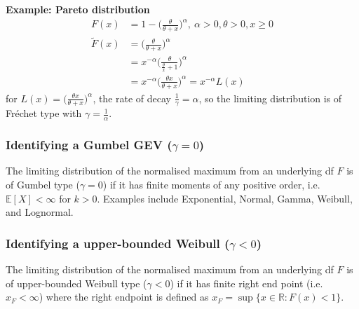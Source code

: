 \documentclass[11pt]{article}
\newcommand{\noi}{\noindent}
\begin{document}
\noi \textbf{Example: Pareto distribution}
\begin{align*}
    F(x) &= 1 - \Big( \frac{\theta}{\theta + x} \Big)^\alpha, \: \alpha >0, \theta > 0, x \geq 0 \\
    \tilde{F}(x) &= \Big(\frac{\theta}{\theta+x}\Big)^\alpha \\
    &= x^{-\alpha}\Big( \frac{\theta}{\frac{\theta}{x}+1} \Big)^{\alpha} \\
    &= x^{-\alpha}\Big( \frac{\theta x}{\theta + x} \Big)^\alpha = x^{-\alpha}L(x)
\end{align*}
\noi for $L(x) = \Big( \frac{\theta x}{\theta + x} \Big)^\alpha$, the rate of decay $\frac{1}{\gamma} = \alpha$, so the limiting distribution is of Fr\'echet type with $\gamma = \frac{1}{\alpha}$.

\subsubsection{Identifying a Gumbel GEV ($\gamma = 0$)}
\noi The limiting distribution of the normalised maximum from an underlying df $F$ is of Gumbel type ($\gamma = 0$) if it has finite moments of any positive order, i.e. $\mathbb{E}[X] < \infty$ for $k > 0$. Examples include Exponential, Normal, Gamma, Weibull, and Lognormal.

\subsubsection{Identifying a upper-bounded Weibull ($\gamma < 0$)}
\noi The limiting distribution of the normalised maximum from an underlying df $F$ is of upper-bounded Weibull type ($\gamma < 0$) if it has finite right end point (i.e. $x_F < \infty$) where the right endpoint is defined as $x_F = \sup\{x \in \mathbb{R}: F(x) < 1\}$.
\end{document}
